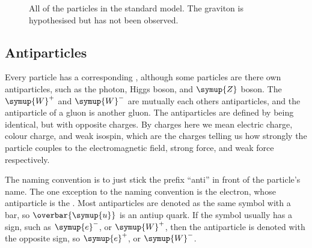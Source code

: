\documentclass[fleqn]{NotesClass}
\newcommand{\Pparticle}[1]{\symup{#1}}
\newcommand{\Pu}{\ensuremath{\Pparticle{u}}}
\newcommand{\Pd}{\ensuremath{\Pparticle{d}}}
\newcommand{\Ps}{\ensuremath{\Pparticle{s}}}
\newcommand{\Pc}{\ensuremath{\Pparticle{c}}}
\newcommand{\Pt}{\ensuremath{\Pparticle{t}}}
\newcommand{\Pb}{\ensuremath{\Pparticle{b}}}
\newcommand{\Pe}{\ensuremath{\Pparticle{e}^{-}}}
\newcommand{\Pmu}{\ensuremath{\text{\normalfont μ}^{-}}}
\newcommand{\Ptau}{\ensuremath{\text{\normalfont τ}^{-}}}
\newcommand{\Pnue}{\ensuremath{\text{\normalfont ν}_{\symup{e}}}}
\newcommand{\Pnumu}{\ensuremath{\text{\normalfont ν}_{\text{μ}}}}
\newcommand{\Pnutau}{\ensuremath{\text{\normalfont ν}_{\text{τ}}}}
\newcommand{\PH}{\ensuremath{\Pparticle{H}}}
\newcommand{\PZ}{\ensuremath{\Pparticle{Z}}}
\newcommand{\PWpm}{\ensuremath{\Pparticle{W}^{\pm}}}
\newcommand{\PWp}{\ensuremath{\Pparticle{W}^{+}}}
\newcommand{\PWm}{\ensuremath{\Pparticle{W}^{-}}}
\newcommand{\Pphoton}{\ensuremath{\text{\normalfont γ}}}
\newcommand{\Pg}{\ensuremath{\Pparticle{g}}}
\newcommand{\APantiparticle}[1]{\overbar{#1}}
\newcommand{\APu}{\ensuremath{\APantiparticle{\Pparticle{u}}}}
\newcommand{\APe}{\ensuremath{\Pparticle{e}^{+}}}
\begin{document}
    \begin{figure}
        \caption{All of the particles in the standard model. The graviton is hypothesised but has not been observed.}
    \end{figure}
    
    \subsection{Antiparticles}
    Every particle has a corresponding , although some particles are there own antiparticles, such as the photon, Higgs boson, and \PZ{} boson.
    The \PWp{} and \PWm{} are mutually each others antiparticles, and the antiparticle of a gluon is another gluon.
    The antiparticles are defined by being identical, but with opposite charges.
    By charges here we mean electric charge, colour charge, and weak isospin, which are the charges telling us how strongly the particle couples to the electromagnetic field, strong force, and weak force respectively.
    
    The naming convention is to just stick the prefix \enquote{anti} in front of the particle's name.
    The one exception to the naming convention is the electron, whose antiparticle is the .
    Most antiparticles are denoted as the same symbol with a bar, so \APu{} is an antiup quark.
    If the symbol usually has a sign, such as \Pe, or \PWp, then the antiparticle is denoted with the opposite sign, so \APe\index{e+@\APe|see{positron}}, or \PWm.
    
\end{document}
